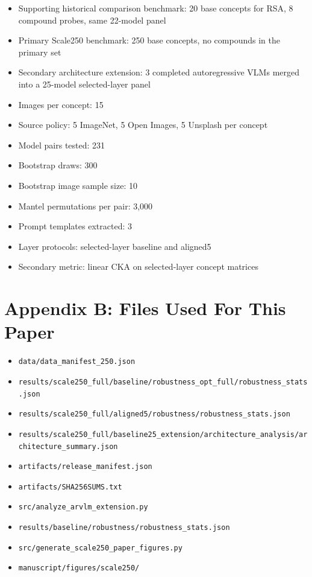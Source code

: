 \documentclass[11pt,a4paper]{article}
\providecommand{\tightlist}{%
  \setlength{\itemsep}{0pt}\setlength{\parskip}{0pt}}
\begin{document}
\begin{itemize}
\tightlist
\item
  Supporting historical comparison benchmark: 20 base concepts for RSA,
  8 compound probes, same 22-model panel
\item
  Primary Scale250 benchmark: 250 base concepts, no compounds in the
  primary set
\item
  Secondary architecture extension: 3 completed autoregressive VLMs
  merged into a 25-model selected-layer panel
\item
  Images per concept: 15
\item
  Source policy: 5 ImageNet, 5 Open Images, 5 Unsplash per concept
\item
  Model pairs tested: 231
\item
  Bootstrap draws: 300
\item
  Bootstrap image sample size: 10
\item
  Mantel permutations per pair: 3,000
\item
  Prompt templates extracted: 3
\item
  Layer protocols: selected-layer baseline and aligned5
\item
  Secondary metric: linear CKA on selected-layer concept matrices
\end{itemize}

\section{Appendix B: Files Used For This
Paper}\label{appendix-b-files-used-for-this-paper}

\begin{itemize}
\tightlist
\item
  \texttt{data/data\_manifest\_250.json}
\item
  \texttt{results/scale250\_full/baseline/robustness\_opt\_full/robustness\_stats.json}
\item
  \texttt{results/scale250\_full/aligned5/robustness/robustness\_stats.json}
\item
  \texttt{results/scale250\_full/baseline25\_extension/architecture\_analysis/architecture\_summary.json}
\item
  \texttt{artifacts/release\_manifest.json}
\item
  \texttt{artifacts/SHA256SUMS.txt}
\item
  \texttt{src/analyze\_arvlm\_extension.py}
\item
  \texttt{results/baseline/robustness/robustness\_stats.json}
\item
  \texttt{src/generate\_scale250\_paper\_figures.py}
\item
  \texttt{manuscript/figures/scale250/}
\end{itemize}
\end{document}

